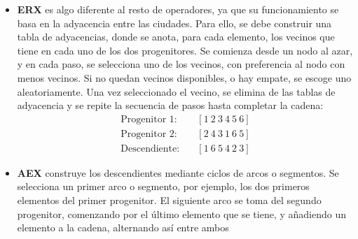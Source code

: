 \begin{itemize}
  resto de elementos faltantes, hasta completar nuevamente la secuencia para ambos progenitores:
  \begin{align*}
    \text{Progenitor 1:}   &\quad [\textbf{8\ 4\ 7\ 3\ 6\ 2\ 5\ 1}] \\
    \text{Progenitor 2:}   &\quad [3\ 6\ 1\ 8\ 5\ 4\ 2\ 7] \\[1em]
    \text{Descendiente 1:} &\quad [\textbf{8}\ 6\ \textbf{7\ 3}\ 5\ 4\ 2\ \textbf{1}] \\
    \text{Descendiente 2:} &\quad [3\ \textbf{4}\ 1\ 8\ \textbf{6\ 2\ 5}\ 7]
  \end{align*}
  \item \textbf{\ac{ERX}} es algo diferente al resto de operadores, ya que su funcionamiento se basa en la adyacencia entre
  las ciudades. Para ello, se debe construir una tabla de adyacencias, donde se anota, para cada elemento, los vecinos que 
  tiene en cada uno de los dos progenitores. Se comienza desde un nodo al azar, y en cada paso, se selecciona uno de los vecinos,
  con preferencia al nodo con menos vecinos. Si no quedan vecinos disponibles, o hay empate, se escoge uno aleatoriamente. Una 
  vez seleccionado el vecino, se elimina de las tablas de adyacencia y se repite la secuencia de pasos hasta completar la cadena:
  \begin{align*}
    \text{Progenitor 1:}   &\quad [1\ 2\ 3\ 4\ 5\ 6] \\
    \text{Progenitor 2:}   &\quad [2\ 4\ 3\ 1\ 6\ 5] \\[1em]
    \text{Descendiente:}   &\quad [1\ 6\ 5\ 4\ 2\ 3]
  \end{align*}
  \item \textbf{\ac{AEX}} construye los descendientes mediante ciclos de arcos o segmentos. Se selecciona un primer arco o 
  segmento, por ejemplo, los dos primeros elementos del primer progenitor. El siguiente arco se toma del segundo progenitor,
  comenzando por el último elemento que se tiene, y añadiendo un elemento a la cadena, alternando así entre ambos

\end{itemize}
